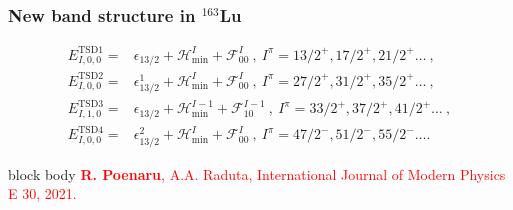 \documentclass{beamer}
\begin{document}
\begin{frame}
	\frametitle{New band structure in $^{163}$Lu}
	\vspace{-0.5cm}
	\begin{align}
		E_{I,0,0}^\text{TSD1}=&\epsilon_{13/2}+\mathcal{H}_\text{min}^I+\mathcal{F}_{00}^I\nonumber\ ,\ I^\pi=13/2^+,17/2^+,21/2^+\dots\ ,\\
		E_{I,0,0}^\text{TSD2}=&\epsilon_{13/2}^1+\mathcal{H}_\text{min}^I+\mathcal{F}_{00}^I\nonumber\ ,\ I^\pi=27/2^+,31/2^+,35/2^+\dots\ ,\\
		E_{I,1,0}^\text{TSD3}=&\epsilon_{13/2}+\mathcal{H}_\text{min}^{I-1}+\mathcal{F}_{10}^{I-1}\nonumber\ ,\ I^\pi=33/2^+,37/2^+,41/2^+\dots\ ,\\
		E_{I,0,0}^\text{TSD4}=&\epsilon_{13/2}^2+\mathcal{H}_\text{min}^I+\mathcal{F}_{00}^I\ ,\ I^\pi=47/2^-,51/2^-,55/2^-\dots\nonumber.
	\end{align}
	\vspace{-1cm}
	\begin{table}
		\centering
	\end{table}
	\begin{beamercolorbox}[rounded=true,shadow=false, wd=\linewidth,]{block body}
		\centering
		\textcolor{red}{\footnotesize{\textbf{R. Poenaru}, A.A. Raduta, International Journal of Modern Physics E 30, 2021.}}
	\end{beamercolorbox}
\end{frame}
\end{document}

